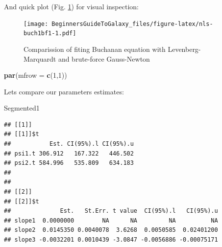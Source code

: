 \documentclass[]{book}
\newenvironment{Shaded}{\begin{snugshade}}{\end{snugshade}}
\newcommand{\KeywordTok}[1]{\textcolor[rgb]{0.13,0.29,0.53}{\textbf{#1}}}
\newcommand{\DataTypeTok}[1]{\textcolor[rgb]{0.13,0.29,0.53}{#1}}
\newcommand{\DecValTok}[1]{\textcolor[rgb]{0.00,0.00,0.81}{#1}}
\newcommand{\OperatorTok}[1]{\textcolor[rgb]{0.81,0.36,0.00}{\textbf{#1}}}
\newcommand{\NormalTok}[1]{#1}
\theoremstyle{definition}
\theoremstyle{definition}
\theoremstyle{definition}
\theoremstyle{remark}
\begin{document}
And quick plot (Fig. \ref{fig:nls-buch1bf1}) for visual inspection:

\begin{Shaded}
\end{Shaded}

\begin{figure}
\centering
\texttt{[image: BeginnersGuideToGalaxy\_files/figure-latex/nls-buch1bf1-1.pdf]}
\caption{\label{fig:nls-buch1bf1}Comparission of fiting Buchanan equation
with Levenberg-Marquardt and brute-force Gauss-Newton}
\end{figure}

\begin{Shaded}
\begin{Highlighting}[]
\KeywordTok{par}\NormalTok{(}\DataTypeTok{mfrow =} \KeywordTok{c}\NormalTok{(}\DecValTok{1}\NormalTok{,}\DecValTok{1}\NormalTok{))}
\end{Highlighting}
\end{Shaded}

Lets compare our parameters estimates:

\begin{Shaded}
\begin{Highlighting}[]
\NormalTok{Segmented1}
\end{Highlighting}
\end{Shaded}

\begin{verbatim}
## [[1]]
## [[1]]$t
##           Est. CI(95%).l CI(95%).u
## psi1.t 306.912   167.322   446.502
## psi2.t 584.996   535.809   634.183
## 
## 
## [[2]]
## [[2]]$t
##              Est.   St.Err. t value  CI(95%).l   CI(95%).u
## slope1  0.0000000        NA      NA         NA          NA
## slope2  0.0145350 0.0040078  3.6268  0.0050585  0.02401200
## slope3 -0.0032201 0.0010439 -3.0847 -0.0056886 -0.00075171
\end{verbatim}
\end{document}
